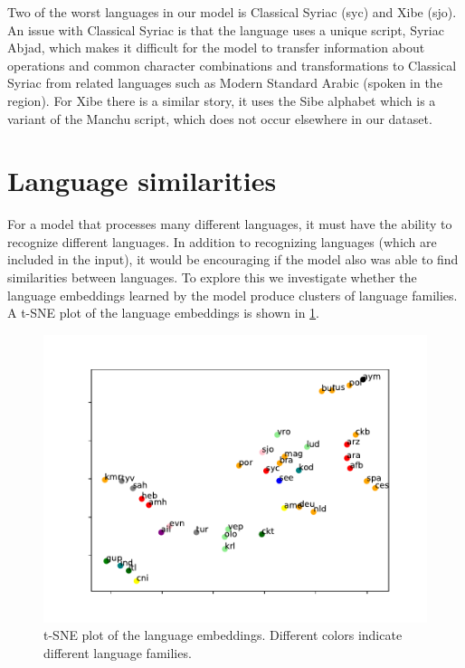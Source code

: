 \documentclass[11pt,a4paper]{article}
\begin{document}
Two of the worst languages in our model is Classical Syriac (syc) and
Xibe (sjo).  An issue with Classical Syriac is that the language uses
a unique script, Syriac Abjad, which makes it difficult for the model
to transfer information about operations and common character
combinations and transformations to Classical Syriac from related
languages such as Modern Standard Arabic (spoken in the region). For
Xibe there is a similar story, it uses the Sibe alphabet which is a
variant of the Manchu script, which does not occur elsewhere in our
dataset.



\section{Language similarities}

For a model that processes many different languages, it must have the
ability to recognize different languages.  In addition to recognizing
languages (which are included in the input), it would be encouraging
if the model also was able to find similarities between languages.  To
explore this we investigate whether the language embeddings learned by
the model produce clusters of language families. A t-SNE plot of the
language embeddings is shown in \cref{fig:lang_tsne}.

\begin{figure}[ht]
\centering
\includegraphics[scale=0.5]{lang_tsne.pdf}
\caption{\label{fig:lang_tsne} t-SNE plot of the language
embeddings. Different colors indicate different language families.}
\end{figure}
\end{document}
